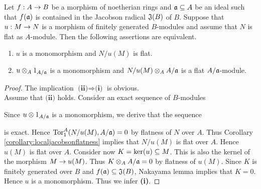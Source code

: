 \begin{corollary}
Let $f:A\rightarrow B$ be a morphism of noetherian rings and $\mathfrak{a}\subseteq A$ be an ideal such that $f(\mathfrak{a})$ is contained in the Jacobson radical $\mathfrak{J}(B)$ of $B$. Suppose that $u:M\rightarrow N$ is a morphism of finitely generated $B$-modules and assume that $N$ is flat as $A$-module. Then the following assertions are equivalent.
\begin{enumerate}[label=\emph{\textbf{(\roman*)}}, leftmargin=*]
\item $u$ is a monomorphism and $N/u(M)$ is flat.
\item $u\otimes_A1_{A/\mathfrak{a}}$ is a monomorphism and $N/u(M)\otimes_AA/\mathfrak{a}$ is a flat $A/\mathfrak{a}$-module.
\end{enumerate}
\end{corollary}
\begin{proof}
The implication $\textbf{(ii)}\Rightarrow \textbf{(i)}$ is obvious.\\
Assume that $\textbf{(ii)}$ holds. Consider an exact sequence of $B$-modules
\begin{center}
\end{center}
Since $u\otimes1_{A/\mathfrak{a}}$ is a monomorphism, we derive that the sequence
\begin{center}
\end{center}
is exact. Hence $\mathrm{Tor}^A_1(N/u(M),A/\mathfrak{a})=0$ by flatness of $N$ over $A$. Thus Corollary \ref{corollary:localjacobsonflatness} implies that $N/u(M)$ is flat over $A$. Hence $u(M)$ is flat over $A$. Consider now $K=\mathrm{ker}(u)\subseteq M$. This is also the kernel of the morphism $M\rightarrow u(M)$. Thus $K\otimes_AA/\mathfrak{a}=0$ by flatness of $u(M)$. Since $K$ is finitely generated over $B$ and $f(\mathfrak{a})\subseteq \mathfrak{J}(B)$, Nakayama lemma implies that $K=0$. Hence $u$ is a monomorphism.  Thus we infer \textbf{(i)}.
\end{proof}

